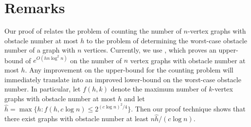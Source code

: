 \documentclass{patmorin}
\DeclareMathOperator{\obs}{obs}
\begin{document}
%
%
%
%
%

\section{Remarks}

Our proof of  relates the problem of counting the number
of $n$-vertex graphs with obstacle number at most $h$ to the problem of
determining the worst-case obstacle number of a graph with $n$ vertices.
Currently, we use , which proves an upper-bound of
$e^{O(hn\log^2 n)}$ on the number of $n$ vertex graphs with obstacle
number at most $h$.  Any improvement on the upper-bound for the counting
problem will immediately translate into an improved lower-bound on
the worst-case obstacle number.  In particular, let $f(h,k)$ denote
the maximum number of $k$-vertex graphs with obstacle number at most
$h$ and let $\hat h = \max\{h:f(h,c\log n) \le 2^{(c\log n)^2/4}\}$.
Then our proof technique shows that there exist graphs with obstacle
number at least $n\hat h/(c\log n)$.



\end{document}
